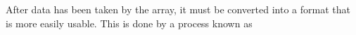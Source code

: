 \documentclass[a4paper,12pt]{article}
\begin{document}
                                                                                                                                                                                                                                                                                                                                                                                                                                                                                                                                                                                                                                                                                                                                                                                                                                                                                                                                                                                                                                                                                                                                                                                                                                                                                                                                                                                                                                                                                                                                                                                                                                                                                                                                                                                                                                                                                                                                                                                                                                                                                                                                                                                                                                                                                                                                                                                                                                                                                                                                                                                                                                                                                                                                                                                                                                                                                                                                                                                                                                                                                                                                                                                                                                                                                                                 After data has been taken by the array, it must be converted into a format that is more easily usable. This is done by a process known as 
\end{document}
